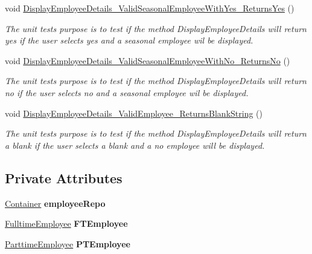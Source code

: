 \begin{DoxyCompactItemize}
void \hyperlink{class_the_company_1_1_tests_1_1_select_employee_tests_a66fd04b6b8a886ac689e940dacd4c933}{Display\+Employee\+Details\+\_\+\+Valid\+Seasonal\+Employee\+With\+Yes\+\_\+\+Returns\+Yes} ()
\begin{DoxyCompactList}\small\item\em The unit test\textquotesingle{}s purpose is to test if the method Display\+Employee\+Details will return yes if the user selects yes and a seasonal employee wil be displayed. \end{DoxyCompactList}\item 
void \hyperlink{class_the_company_1_1_tests_1_1_select_employee_tests_af444eebfcb96fadc14b01e0f32ae77ea}{Display\+Employee\+Details\+\_\+\+Valid\+Seasonal\+Employee\+With\+No\+\_\+\+Returns\+No} ()
\begin{DoxyCompactList}\small\item\em The unit test\textquotesingle{}s purpose is to test if the method Display\+Employee\+Details will return no if the user selects no and a seasonal employee wil be displayed. \end{DoxyCompactList}\item 
void \hyperlink{class_the_company_1_1_tests_1_1_select_employee_tests_aed995750b42fab5ca2d7911045a53af3}{Display\+Employee\+Details\+\_\+\+Valid\+Employee\+\_\+\+Returns\+Blank\+String} ()
\begin{DoxyCompactList}\small\item\em The unit test\textquotesingle{}s purpose is to test if the method Display\+Employee\+Details will return a blank if the user selects a blank and a no employee will be displayed. \end{DoxyCompactList}\end{DoxyCompactItemize}
\subsection*{Private Attributes}
\begin{DoxyCompactItemize}
\item 
\hypertarget{class_the_company_1_1_tests_1_1_select_employee_tests_a1c3351dd9b04a7b3a7eb61e084739a61}{}\hyperlink{class_the_company_1_1_container}{Container} {\bfseries employee\+Repo}\label{class_the_company_1_1_tests_1_1_select_employee_tests_a1c3351dd9b04a7b3a7eb61e084739a61}

\item 
\hypertarget{class_the_company_1_1_tests_1_1_select_employee_tests_a4569271e9efd81e7ff81d6d20d2af932}{}\hyperlink{class_all_employees_1_1_fulltime_employee}{Fulltime\+Employee} {\bfseries F\+T\+Employee}\label{class_the_company_1_1_tests_1_1_select_employee_tests_a4569271e9efd81e7ff81d6d20d2af932}

\item 
\hypertarget{class_the_company_1_1_tests_1_1_select_employee_tests_aca371fc7afd6d27c0af616a093033425}{}\hyperlink{class_all_employees_1_1_parttime_employee}{Parttime\+Employee} {\bfseries P\+T\+Employee}\label{class_the_company_1_1_tests_1_1_select_employee_tests_aca371fc7afd6d27c0af616a093033425}

\end{DoxyCompactItemize}


